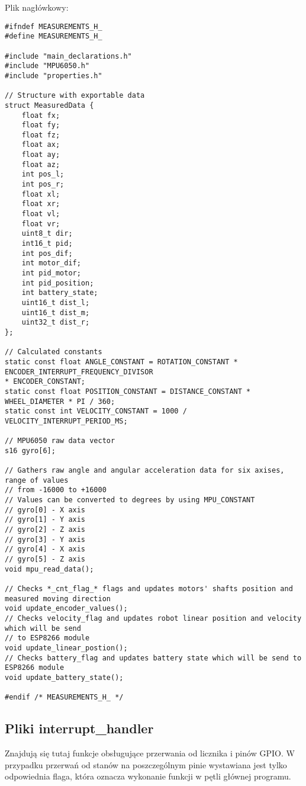 \documentclass[a4paper,12pt,twoside,openany]{report}
\begin{document}
\newpage
\noindent Plik nagłówkowy:\\
\begin{lstlisting}[style=customc]
#ifndef MEASUREMENTS_H_
#define MEASUREMENTS_H_

#include "main_declarations.h"
#include "MPU6050.h"
#include "properties.h"

// Structure with exportable data
struct MeasuredData {
	float fx;
	float fy;
	float fz;
	float ax;
	float ay;
	float az;
	int pos_l;
	int pos_r;
	float xl;
	float xr;
	float vl;
	float vr;
	uint8_t dir;
	int16_t pid;
	int pos_dif;
	int motor_dif;
	int pid_motor;
	int pid_position;
	int battery_state;
	uint16_t dist_l;
	uint16_t dist_m;
	uint32_t dist_r;
};

// Calculated constants
static const float ANGLE_CONSTANT = ROTATION_CONSTANT * ENCODER_INTERRUPT_FREQUENCY_DIVISOR 
* ENCODER_CONSTANT;
static const float POSITION_CONSTANT = DISTANCE_CONSTANT * WHEEL_DIAMETER * PI / 360;
static const int VELOCITY_CONSTANT = 1000 / VELOCITY_INTERRUPT_PERIOD_MS;

// MPU6050 raw data vector
s16 gyro[6];

// Gathers raw angle and angular acceleration data for six axises, range of values 
// from -16000 to +16000
// Values can be converted to degrees by using MPU_CONSTANT
// gyro[0] - X axis
// gyro[1] - Y axis
// gyro[2] - Z axis
// gyro[3] - Y axis
// gyro[4] - X axis
// gyro[5] - Z axis
void mpu_read_data();

// Checks *_cnt_flag_* flags and updates motors' shafts position and measured moving direction
void update_encoder_values();
// Checks velocity_flag and updates robot linear position and velocity which will be send 
// to ESP8266 module
void update_linear_postion();
// Checks battery_flag and updates battery state which will be send to ESP8266 module
void update_battery_state();

#endif /* MEASUREMENTS_H_ */

\end{lstlisting}

\subsection{Pliki interrupt\_handler}

Znajdują się tutaj funkcje obsługujące przerwania od licznika i pinów GPIO. W przypadku przerwań od stanów na poszczególnym pinie wystawiana jest tylko odpowiednia flaga, która oznacza wykonanie funkcji w pętli głównej programu. 
\end{document}
